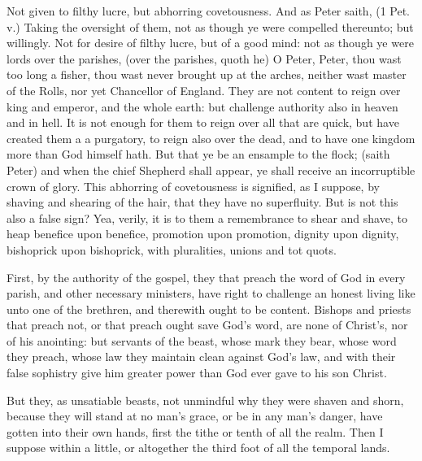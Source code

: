 Not given to filthy lucre, but abhorring covetousness. 
And as Peter saith, (1 Pet. v.) Taking the oversight of 
them, not as though ye were compelled thereunto; but 
willingly. Not for desire of filthy lucre, but of a good 
mind: not as though ye were lords over the parishes, (over 
the parishes, quoth he) O Peter, Peter, thou wast too 
long a fisher, thou wast never brought up at the arches, 
neither wast master of the Rolls, nor yet Chancellor of 
England. They are not content to reign over king and 
emperor, and the whole earth: but challenge authority 
also in heaven and in hell. It is not enough for them to 
reign over all that are quick, but have created them a 
a purgatory, to reign also over the dead, and to have one 
kingdom more than God himself hath. But that ye be 
an ensample to the flock; (saith Peter) and when the 
chief Shepherd shall appear, ye shall receive an incorruptible
crown of glory. This abhorring of covetousness 
is signified, as I suppose, by shaving and shearing of the 
hair, that they have no superfluity. But is not this also 
a false sign? Yea, verily, it is to them a remembrance 
to shear and shave, to heap benefice upon benefice, promotion
upon promotion, dignity upon dignity, bishoprick 
upon bishoprick, with pluralities, unions and tot quots. 

First, by the authority of the gospel, they that preach 
the word of God in every parish, and other necessary 
ministers, have right to challenge an honest living like 
unto one of the brethren, and therewith ought to be content.
Bishops and priests that preach not, or that preach 
ought save God's word, are none of Christ's, nor of his 
anointing: but servants of the beast, whose mark they 
bear, whose word they preach, whose law they maintain 
clean against God's law, and with their false sophistry give 
him greater power than God ever gave to his son Christ. 

But they, as unsatiable beasts, not unmindful why they 
were shaven and shorn, because they will stand at no man's 
grace, or be in any man's danger, have gotten into their 
own hands, first the tithe or tenth of all the realm. Then 
I suppose within a little, or altogether the third foot of 
all the temporal lands. 

